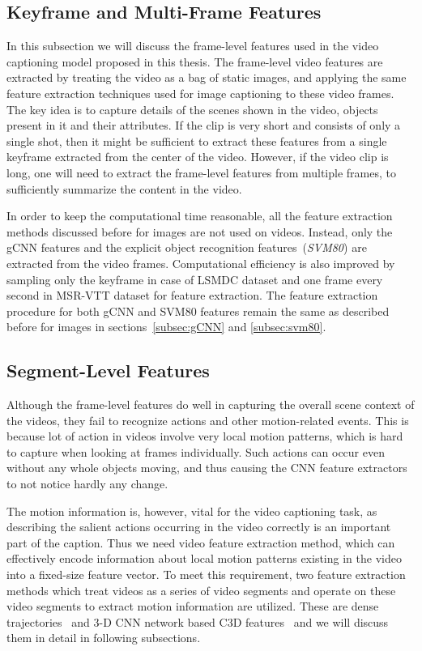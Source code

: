 \subsection{Keyframe and Multi-Frame Features}
In this subsection we will discuss the frame-level features used in the video
captioning model proposed in this thesis.
The frame-level video features are extracted by treating the video as a bag of
static images, and applying the same feature extraction techniques used for
image captioning to these video frames.
The key idea is to capture details of the scenes shown in the video, objects
present in it and their attributes.
If the clip is very short and consists of only a single shot, then it might be
sufficient to extract these features from a single keyframe extracted from the
center of the video. 
However, if the video clip is long, one will need to extract the frame-level
features from multiple frames, to sufficiently summarize the content in the
video.

In order to keep the computational time reasonable, all the feature extraction
methods discussed before for images are not used on videos.
Instead, only the gCNN features and the explicit object recognition
features~(\emph{SVM80}) are extracted from the video frames.
Computational efficiency is also improved by sampling only the keyframe in case
of LSMDC dataset and one frame every second in MSR-VTT dataset for feature
extraction.
The feature extraction procedure for both gCNN and SVM80 features remain the
same as described before for images in sections~\ref{subsec:gCNN} and
\ref{subsec:svm80}. 

\subsection{Segment-Level Features}
Although the frame-level features do well in capturing the overall scene
context of the videos, they fail to recognize actions and other motion-related
events.
This is because lot of action in videos involve very local motion patterns,
which is hard to capture when looking at frames individually.
Such actions can occur even without any whole objects moving, and thus causing
the CNN feature extractors to not notice hardly any change.

The motion information is, however, vital for the video captioning task, as
describing the salient actions occurring in the video correctly is an important
part of the caption.
Thus we need video feature extraction method, which can effectively encode
information about local motion patterns existing in the video into a fixed-size
feature vector.
To meet this requirement, two feature extraction methods which treat videos as a
series of video segments and operate on these video segments to extract motion
information are utilized.
These are dense trajectories~\cite{DBLP:conf/cvpr/WangKSL11, Wang2013} and 3-D CNN
network based C3D features~\cite{DBLP:C3D} and we will discuss them in detail in
following subsections.

